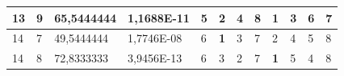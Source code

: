 \documentclass[conference]{IEEEtran}
\begin{document}
\begin{table}[]
\begin{tabular}{|llll|llllllll|}
\multicolumn{1}{|l|}{13}                                                    & \multicolumn{1}{l|}{9}                                                        & \multicolumn{1}{l|}{65,5444444}                                                   & 1,1688E-11                     & \multicolumn{1}{l|}{5}                                                  & \multicolumn{1}{l|}{2}                                                  & \multicolumn{1}{l|}{4}                                                  & \multicolumn{1}{l|}{8}                                                  & \multicolumn{1}{l|}{\textbf{1}}                                         & \multicolumn{1}{l|}{3}                                                  & \multicolumn{1}{l|}{6}                                                  & 7                          \\ \hline
\multicolumn{1}{|l|}{14}                                                    & \multicolumn{1}{l|}{7}                                                        & \multicolumn{1}{l|}{49,5444444}                                                   & 1,7746E-08                     & \multicolumn{1}{l|}{6}                                                  & \multicolumn{1}{l|}{\textbf{1}}                                         & \multicolumn{1}{l|}{3}                                                  & \multicolumn{1}{l|}{7}                                                  & \multicolumn{1}{l|}{2}                                                  & \multicolumn{1}{l|}{4}                                                  & \multicolumn{1}{l|}{5}                                                  & 8                          \\ \hline
\multicolumn{1}{|l|}{14}                                                    & \multicolumn{1}{l|}{8}                                                        & \multicolumn{1}{l|}{72,8333333}                                                   & 3,9456E-13                     & \multicolumn{1}{l|}{6}                                                  & \multicolumn{1}{l|}{3}                                                  & \multicolumn{1}{l|}{2}                                                  & \multicolumn{1}{l|}{7}                                                  & \multicolumn{1}{l|}{\textbf{1}}                                         & \multicolumn{1}{l|}{5}                                                  & \multicolumn{1}{l|}{4}                                                  & 8                          \\ \hline

\end{tabular}
\end{table}
\end{document}
